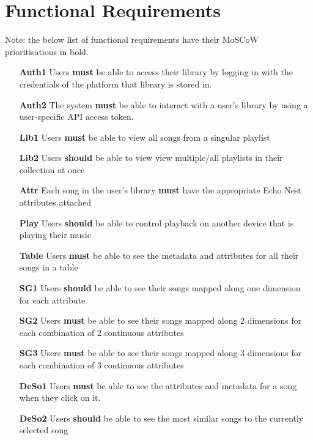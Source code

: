 \section{Functional Requirements}
Note: the below list of functional requirements have their MoSCoW prioritisations in bold.
\begin{itemize}
    \item[\textbf{Auth1}] Users \textbf{must} be able to access their library by logging in with the credentials of the platform that library is stored in.
    \item[\textbf{Auth2}] The system \textbf{must} be able to interact with a user's library by using a user-specific API access token.
    \item[\textbf{Lib1}] Users \textbf{must} be able to view all songs from a singular playlist
    \item[\textbf{Lib2}] Users \textbf{should} be able to view view multiple/all playlists in their collection at once
    \item[\textbf{Attr}] Each song in the user's library \textbf{must} have the appropriate Echo Nest attributes attached
    \item[\textbf{Play}] Users \textbf{should} be able to control playback on another device that is playing their music
    \item[\textbf{Table}] Users \textbf{must} be able to see the metadata and attributes for all their songs in a table
    \item[\textbf{SG1}] Users \textbf{should} be able to see their songs mapped along one dimension for each attribute
    \item[\textbf{SG2}] Users \textbf{must} be able to see their songs mapped along 2 dimensions for each combination of 2 continuous attributes
    \item[\textbf{SG3}] Users \textbf{must} be able to see their songs mapped along 3 dimensions for each combination of 3 continuous attributes
    \item[\textbf{DeSo1}] Users \textbf{must} be able to see the attributes and metadata for a song when they click on it.
    \item[\textbf{DeSo2}] Users \textbf{should} be able to see the most similar songs to the currently selected song

\end{itemize}
